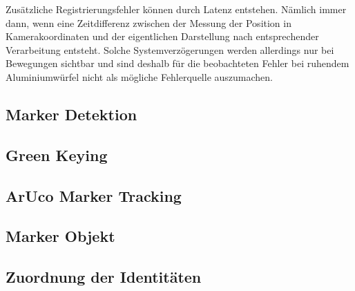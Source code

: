 Zusätzliche Registrierungsfehler können durch Latenz entstehen. Nämlich immer dann, wenn eine Zeitdifferenz zwischen der Messung der Position in Kamerakoordinaten und der eigentlichen Darstellung nach entsprechender
Verarbeitung entsteht. Solche Systemverzögerungen werden allerdings nur bei Bewegungen sichtbar und sind deshalb für die beobachteten Fehler bei ruhendem Aluminiumwürfel nicht als mögliche Fehlerquelle auszumachen. 
\subsection{Marker Detektion}
\subsection{Green Keying}
\subsection{ArUco Marker Tracking}

\subsection{Marker Objekt}
\subsection{Zuordnung der Identitäten}

\newpage